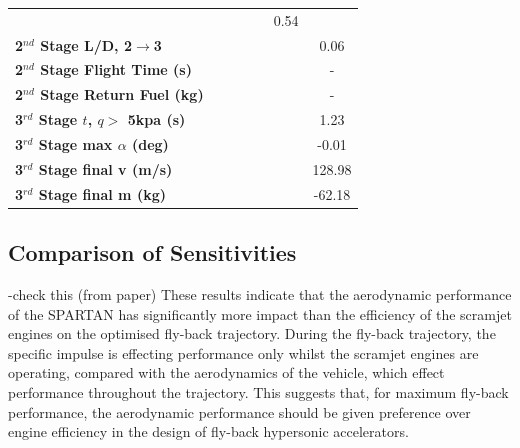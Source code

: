 \begin{table}[ht]
\begin{tabular}{l c c c c c c}
		& \secondthirdSeparationqTThreeNinetyFive
		& \secondthirdSeparationqTThreeStandard
		& \secondthirdSeparationqTThreeOneHundredFive
		& \secondthirdSeparationqTThreeOneHundredTen
		&0.54
		\\
		\textbf{2$^{nd}$ Stage L/D, 2$\rightarrow$3}
		& \secondthirdSeparationLDTThreeNinety
		& \secondthirdSeparationLDTThreeNinetyFive
		& \secondthirdSeparationLDTThreeStandard
		& \secondthirdSeparationLDTThreeOneHundredFive
		& \secondthirdSeparationLDTThreeOneHundredTen
		&0.06
		\\
		\textbf{2$^{nd}$ Stage Flight Time (s)}
		& \secondFlightTimeTThreeNinety
		& \secondFlightTimeTThreeNinetyFive
		& \secondFlightTimeTThreeStandard
		& \secondFlightTimeTThreeOneHundredFive
		& \secondFlightTimeTThreeOneHundredTen
		& -
		\\
		\textbf{2$^{nd}$ Stage Return Fuel (kg)}
		& \returnFuelTThreeNinety
		& \returnFuelTThreeNinetyFive
		& \returnFuelTThreeStandard
		& \returnFuelTThreeOneHundredFive
		& \returnFuelTThreeOneHundredTen
		& -
		\\
		\textbf{3$^{rd}$ Stage $t$, $q >$ 5kpa (s)}
		& \thirdqOverFiveTThreeNinety
		& \thirdqOverFiveTThreeNinetyFive
		& \thirdqOverFiveTThreeStandard
		& \thirdqOverFiveTThreeOneHundredFive
		& \thirdqOverFiveTThreeOneHundredTen
		&1.23
		\\
		\textbf{3$^{rd}$ Stage max $\alpha$ (deg)}
		& \thirdmaxAoATThreeNinety
		& \thirdmaxAoATThreeNinetyFive
		& \thirdmaxAoATThreeStandard
		& \thirdmaxAoATThreeOneHundredFive
		& \thirdmaxAoATThreeOneHundredTen
		&-0.01
		\\
		\textbf{3$^{rd}$ Stage final v (m/s)}
		& \thirdcircvTThreeNinety
		& \thirdcircvTThreeNinetyFive
		& \thirdcircvTThreeStandard
		& \thirdcircvTThreeOneHundredFive
		& \thirdcircvTThreeOneHundredTen
		&128.98
		\\
		\textbf{3$^{rd}$ Stage final m (kg)}
		& \thirdcircmTThreeNinety
		& \thirdcircmTThreeNinetyFive
		& \thirdcircmTThreeStandard
		& \thirdcircmTThreeOneHundredFive
		& \thirdcircmTThreeOneHundredTen
		&-62.18
		\\
		\hline 
	\end{tabular} 
\end{table}



\subsection{Comparison of Sensitivities}

-check this (from paper)
These results indicate that the aerodynamic performance of the SPARTAN has significantly more impact than the efficiency of the scramjet engines on the optimised fly-back trajectory. During the fly-back trajectory, the specific impulse is effecting performance only whilst the scramjet engines are operating, compared with the aerodynamics of the vehicle, which effect performance throughout the trajectory. This suggests that, for maximum fly-back performance, the aerodynamic performance should be given preference over engine efficiency in the design of fly-back hypersonic accelerators. 

